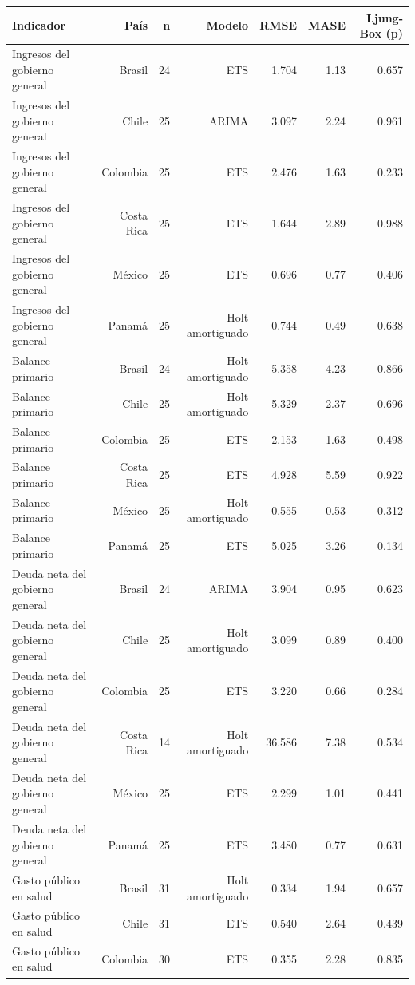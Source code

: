 
\begin{tabular}{lrrrrrr}
\toprule
Indicador & País & n & Modelo & RMSE & MASE & Ljung-Box (p)\\
\midrule
Ingresos del gobierno general & Brasil & 24 & ETS & 1.704 & 1.13 & 0.657\\
Ingresos del gobierno general & Chile & 25 & ARIMA & 3.097 & 2.24 & 0.961\\
Ingresos del gobierno general & Colombia & 25 & ETS & 2.476 & 1.63 & 0.233\\
Ingresos del gobierno general & Costa Rica & 25 & ETS & 1.644 & 2.89 & 0.988\\
Ingresos del gobierno general & México & 25 & ETS & 0.696 & 0.77 & 0.406\\
Ingresos del gobierno general & Panamá & 25 & Holt amortiguado & 0.744 & 0.49 & 0.638\\
Balance primario & Brasil & 24 & Holt amortiguado & 5.358 & 4.23 & 0.866\\
Balance primario & Chile & 25 & Holt amortiguado & 5.329 & 2.37 & 0.696\\
Balance primario & Colombia & 25 & ETS & 2.153 & 1.63 & 0.498\\
Balance primario & Costa Rica & 25 & ETS & 4.928 & 5.59 & 0.922\\
Balance primario & México & 25 & Holt amortiguado & 0.555 & 0.53 & 0.312\\
Balance primario & Panamá & 25 & ETS & 5.025 & 3.26 & 0.134\\
Deuda neta del gobierno general & Brasil & 24 & ARIMA & 3.904 & 0.95 & 0.623\\
Deuda neta del gobierno general & Chile & 25 & Holt amortiguado & 3.099 & 0.89 & 0.400\\
Deuda neta del gobierno general & Colombia & 25 & ETS & 3.220 & 0.66 & 0.284\\
Deuda neta del gobierno general & Costa Rica & 14 & Holt amortiguado & 36.586 & 7.38 & 0.534\\
Deuda neta del gobierno general & México & 25 & ETS & 2.299 & 1.01 & 0.441\\
Deuda neta del gobierno general & Panamá & 25 & ETS & 3.480 & 0.77 & 0.631\\
Gasto público en salud & Brasil & 31 & Holt amortiguado & 0.334 & 1.94 & 0.657\\
Gasto público en salud & Chile & 31 & ETS & 0.540 & 2.64 & 0.439\\
Gasto público en salud & Colombia & 30 & ETS & 0.355 & 2.28 & 0.835\\

\end{tabular}
